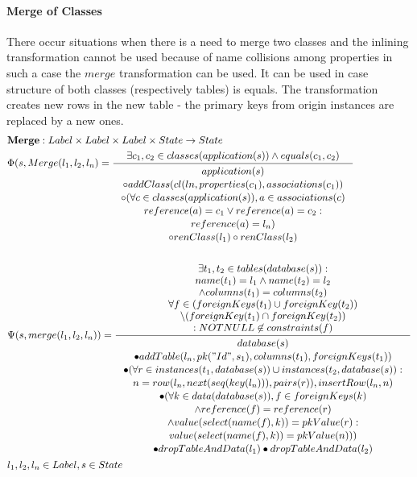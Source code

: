 \documentclass[11pt]{article}
\begin{document}
\paragraph{Merge of Classes} There occur situations when there is a need to merge two classes and the inlining transformation cannot be used because of name collisions among properties in such a case the $merge$ transformation can be used. It can be used in case structure of both classes (respectively tables) is equals. The transformation creates new rows in the new table - the primary keys from origin instances are replaced by a new ones.
\begin{align*}
&	\mathbf{Merge} : Label \times Label \times Label \times State \rightarrow State \\
&	\Phi(s, Merge(l_1, l_2, l_n) = \inference{
		\exists c_1, c_2 \in classes(application(s)) \wedge 
		equals(c_1, c_2)}{\begin{gathered}
			application(s) \\ \circ addClass(cl(ln, properties(c_1), associations(c_1)) \\
			\circ (\forall c \in classes (application(s)), a \in associations(c) \\
			reference(a) = c_1 \vee reference(a) = c_2 : \\
			reference(a) = l_n) \\
			\circ renClass(l_1) \circ renClass(l_2) \end{gathered}}
 \\\\
&	\Psi(s, merge(l_1, l_2, l_n)) = \inference{\exists t_1, t_2 \in tables(database(s)) : \\ name(t_1) = l_1 \wedge name(t_2) = l_2 \\ \wedge columns(t_1) = columns(t_2)\\
\forall f \in (foreignKeys(t_1) \cup foreignKey(t_2)) \\ \setminus (foreignKey(t_1) \cap foreignKey(t_2)) \\ : NOTNULL \not \in constraints(f)  }{\begin{gathered}
	 database(s) \\ \bullet addTable(l_n, pk("Id", s_1), columns(t_1), foreignKeys(t_1)) \\ 
\bullet (\forall r \in instances(t_1, database(s)) \cup instances(t_2, database(s)) :  \\ n =  row(l_n, next(seq(key(l_n))), pairs(r)), insertRow(l_n, n) \\ 
\bullet (\forall k \in data(database(s)), f \in foreignKeys(k) \\ \wedge reference(f) = reference(r) \\ \wedge value(select(name(f), k)) = pkValue(r) : \\value(select(name(f), k)) = pkValue(n))) \\  \bullet dropTableAndData(l_1) \bullet dropTableAndData(l_2)
 \end{gathered}} \\
 & l_1, l_2, l_n \in Label, s \in State
\end{align*}
\end{document}
